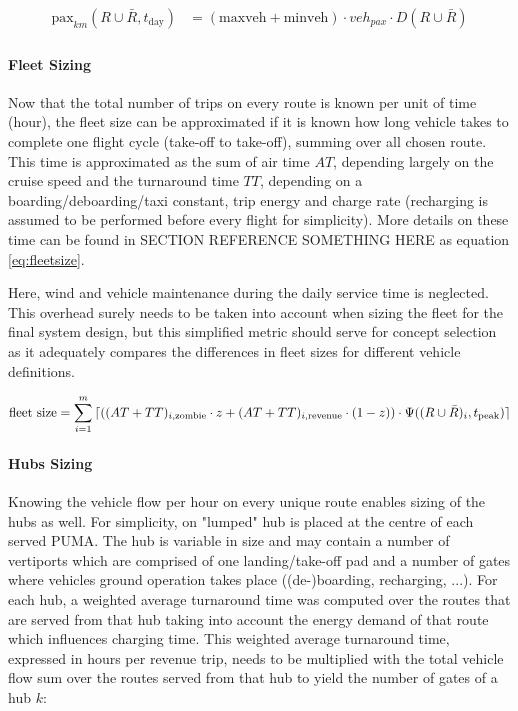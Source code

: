 \begin{align} \label{eq:paxkm}
\begin{split}
    \text{pax}_{km}(R\cup\bar{R}, t_{\text{day}}) &= \left( \text{maxveh} + \text{minveh} \right) \cdot veh_{pax} \cdot D(R\cup\bar{R})
\end{split}
\end{align}


\paragraph{Fleet Sizing}

Now that the total number of trips on every route is known per unit of time (hour), the fleet size can be approximated if it is known how long vehicle takes to complete one flight cycle (take-off to take-off), summing over all chosen route. This time is approximated as the sum of air time $AT$, depending largely on the cruise speed and the turnaround time $TT$, depending on a boarding/deboarding/taxi constant, trip energy and charge rate (recharging is assumed to be performed before every flight for simplicity). More details on these time can be found in SECTION REFERENCE SOMETHING HERE as equation \autoref{eq:fleetsize}.

Here, wind and vehicle maintenance during the daily service time is neglected. This overhead surely needs to be taken into account when sizing the fleet for the final system design, but this simplified metric should serve for concept selection as it adequately compares the differences in fleet sizes for different vehicle definitions.

\begin{align} \label{eq:fleetsize}
    \text{fleet size} = \sum_{i=1}^m { \lceil \left( (AT + TT)_{i, \text{zombie}} \cdot z + (AT + TT)_{i, \text{revenue}} \cdot (1-z) \right) \cdot \Psi((R\cup\bar{R})_i, t_{\text{peak}}) \rceil }
\end{align}


\paragraph{Hubs Sizing}

Knowing the vehicle flow per hour on every unique route enables sizing of the hubs as well. For simplicity, on "lumped" hub is placed at the centre of each served PUMA. The hub is variable in size and may contain a number of vertiports which are comprised of one landing/take-off pad and a number of gates where vehicles ground operation takes place ((de-)boarding, recharging, ...). For each hub, a weighted average turnaround time was computed over the routes that are served from that hub taking into account the energy demand of that route which influences charging time. This weighted average turnaround time, expressed in hours per revenue trip, needs to be multiplied with the total vehicle flow sum over the routes served from that hub to yield the number of gates of a hub $k$:

